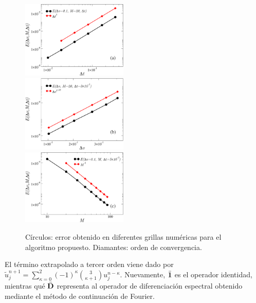 \begin{figure}
  \includegraphics[width=0.45\textwidth]{figuras/errdt.pdf}\\
  \vspace{2mm}
  \includegraphics[width=0.45\textwidth]{figuras/errdx.pdf}\\
  \vspace{2mm}
  \includegraphics[width=0.45\textwidth]{figuras/xiconv.pdf}
  \caption{Círculos: error obtenido en diferentes grillas numéricas para el algoritmo 
  propuesto. Diamantes: orden de convergencia.}
 \label{fig:conv}
\end{figure}

\noindent El término extrapolado 
a tercer orden viene dado por $\tilde{u}_j^{n+1}=\sum_{\kappa=0}^{2}(-1)^\kappa {3 \choose \kappa+1} u_j^{n-\kappa}$.
 Nuevamente, 
$\bar{\mathbf{1}}$ es 
\noindent el operador identidad, mientras qué $\bar{\mathbf{D}}$ representa al operador 
de diferenciación espectral obtenido mediante el método de continuación de Fourier. 

